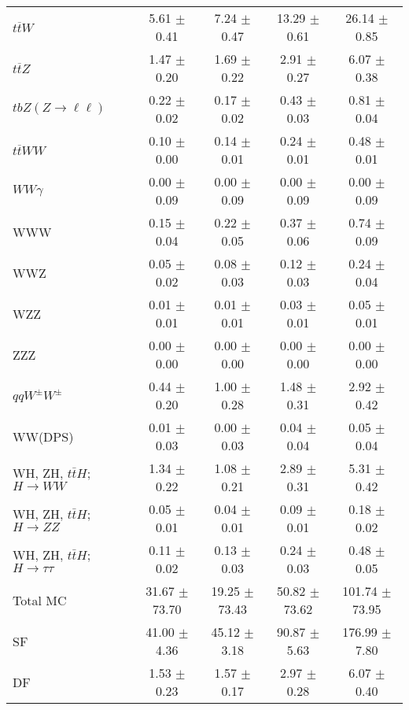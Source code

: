 \begin{tabular}{l|cccc}
                   $t\overline{t}W$ &  5.61 $\pm$  0.41 &  7.24 $\pm$  0.47 & 13.29 $\pm$  0.61 & 26.14 $\pm$  0.85 \\
                   $t\overline{t}Z$ &  1.47 $\pm$  0.20 &  1.69 $\pm$  0.22 &  2.91 $\pm$  0.27 &  6.07 $\pm$  0.38 \\
    $tbZ (Z \rightarrow \ell \ell)$ &  0.22 $\pm$  0.02 &  0.17 $\pm$  0.02 &  0.43 $\pm$  0.03 &  0.81 $\pm$  0.04 \\
                  $t\overline{t}WW$ &  0.10 $\pm$  0.00 &  0.14 $\pm$  0.01 &  0.24 $\pm$  0.01 &  0.48 $\pm$  0.01 \\
                         $WW\gamma$ &  0.00 $\pm$  0.09 &  0.00 $\pm$  0.09 &  0.00 $\pm$  0.09 &  0.00 $\pm$  0.09 \\
                                WWW &  0.15 $\pm$  0.04 &  0.22 $\pm$  0.05 &  0.37 $\pm$  0.06 &  0.74 $\pm$  0.09 \\
                                WWZ &  0.05 $\pm$  0.02 &  0.08 $\pm$  0.03 &  0.12 $\pm$  0.03 &  0.24 $\pm$  0.04 \\
                                WZZ &  0.01 $\pm$  0.01 &  0.01 $\pm$  0.01 &  0.03 $\pm$  0.01 &  0.05 $\pm$  0.01 \\
                                ZZZ &  0.00 $\pm$  0.00 &  0.00 $\pm$  0.00 &  0.00 $\pm$  0.00 &  0.00 $\pm$  0.00 \\
                 $qqW^{\pm}W^{\pm}$ &  0.44 $\pm$  0.20 &  1.00 $\pm$  0.28 &  1.48 $\pm$  0.31 &  2.92 $\pm$  0.42 \\
                            WW(DPS) &  0.01 $\pm$  0.03 &  0.00 $\pm$  0.03 &  0.04 $\pm$  0.04 &  0.05 $\pm$  0.04 \\
WH, ZH, $t\bar{t}H$; $H \rightarrow WW$ &  1.34 $\pm$  0.22 &  1.08 $\pm$  0.21 &  2.89 $\pm$  0.31 &  5.31 $\pm$  0.42 \\
WH, ZH, $t\bar{t}H$; $H \rightarrow ZZ$ &  0.05 $\pm$  0.01 &  0.04 $\pm$  0.01 &  0.09 $\pm$  0.01 &  0.18 $\pm$  0.02 \\
WH, ZH, $t\bar{t}H$; $H \rightarrow \tau\tau$ &  0.11 $\pm$  0.02 &  0.13 $\pm$  0.03 &  0.24 $\pm$  0.03 &  0.48 $\pm$  0.05 \\
\hline\hline
                           Total MC & 31.67 $\pm$ 73.70 & 19.25 $\pm$ 73.43 & 50.82 $\pm$ 73.62 & 101.74 $\pm$ 73.95 \\
\hline
                                 SF & 41.00 $\pm$  4.36 & 45.12 $\pm$  3.18 & 90.87 $\pm$  5.63 & 176.99 $\pm$  7.80 \\
                                 DF &  1.53 $\pm$  0.23 &  1.57 $\pm$  0.17 &  2.97 $\pm$  0.28 &  6.07 $\pm$  0.40 \\

\end{tabular}
